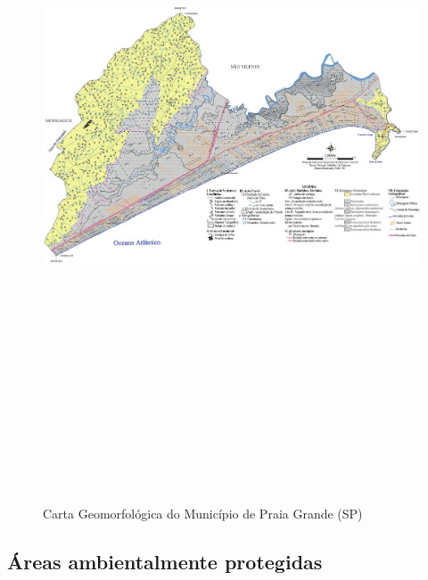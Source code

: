 	\begin{landscape}
		\begin{figure}[h]
			\centering
			\caption{Carta Geomorfológica do Município de Praia Grande (SP)}
			\includegraphics[width=21cm,height=21cm,keepaspectratio]{img/drenagem.png}
			\label{mapa_drenagem}
		\end{figure}
	\end{landscape}
	
	\subsection{Áreas ambientalmente protegidas}
	
